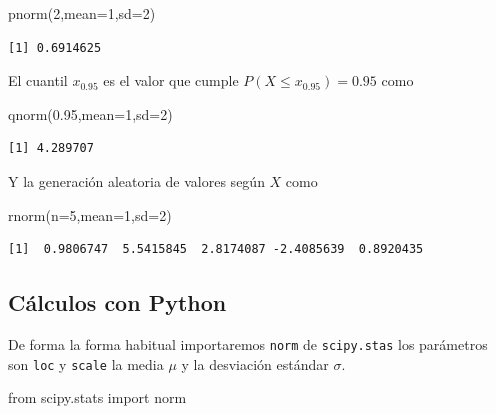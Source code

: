 \documentclass[
  letterpaper,
  DIV=11,
  numbers=noendperiod]{scrreprt}
\newenvironment{Shaded}{\begin{snugshade}}{\end{snugshade}}
\newcommand{\AttributeTok}[1]{\textcolor[rgb]{0.40,0.45,0.13}{#1}}
\newcommand{\DecValTok}[1]{\textcolor[rgb]{0.68,0.00,0.00}{#1}}
\newcommand{\FloatTok}[1]{\textcolor[rgb]{0.68,0.00,0.00}{#1}}
\newcommand{\FunctionTok}[1]{\textcolor[rgb]{0.28,0.35,0.67}{#1}}
\newcommand{\ImportTok}[1]{\textcolor[rgb]{0.00,0.46,0.62}{#1}}
\newcommand{\NormalTok}[1]{\textcolor[rgb]{0.00,0.23,0.31}{#1}}
\begin{document}
\begin{Shaded}
\begin{Highlighting}[]
\FunctionTok{pnorm}\NormalTok{(}\DecValTok{2}\NormalTok{,}\AttributeTok{mean=}\DecValTok{1}\NormalTok{,}\AttributeTok{sd=}\DecValTok{2}\NormalTok{) }
\end{Highlighting}
\end{Shaded}

\begin{verbatim}
[1] 0.6914625
\end{verbatim}

El cuantil \(x_{0.95}\) es el valor que cumple
\(P(X\leq x_{0.95})=0.95\) como

\begin{Shaded}
\begin{Highlighting}[]
\FunctionTok{qnorm}\NormalTok{(}\FloatTok{0.95}\NormalTok{,}\AttributeTok{mean=}\DecValTok{1}\NormalTok{,}\AttributeTok{sd=}\DecValTok{2}\NormalTok{)}
\end{Highlighting}
\end{Shaded}

\begin{verbatim}
[1] 4.289707
\end{verbatim}

Y la generación aleatoria de valores según \(X\) como

\begin{Shaded}
\begin{Highlighting}[]
\FunctionTok{rnorm}\NormalTok{(}\AttributeTok{n=}\DecValTok{5}\NormalTok{,}\AttributeTok{mean=}\DecValTok{1}\NormalTok{,}\AttributeTok{sd=}\DecValTok{2}\NormalTok{)}
\end{Highlighting}
\end{Shaded}

\begin{verbatim}
[1]  0.9806747  5.5415845  2.8174087 -2.4085639  0.8920435
\end{verbatim}

\subsection{Cálculos con Python}\label{cuxe1lculos-con-python-4}

De forma la forma habitual importaremos \texttt{norm} de
\texttt{scipy.stas} los parámetros son \texttt{loc} y \texttt{scale} la
media \(\mu\) y la desviación estándar \(\sigma\).

\begin{Shaded}
\begin{Highlighting}[]
\ImportTok{from}\NormalTok{ scipy.stats }\ImportTok{import}\NormalTok{ norm}
\end{Highlighting}
\end{Shaded}
\end{document}

